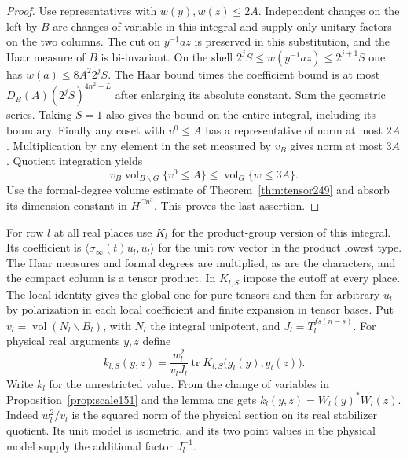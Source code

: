 \documentclass[a4paper,11pt]{article}
\theoremstyle{definition}
\theoremstyle{remark}
\numberwithin{equation}{section}
\begin{document}
\begin{proof}
Use representatives with \(w(y),w(z)\le2A\).
Independent changes on the left by \(B\) are changes of variable
in this integral and supply only unitary factors on the two
columns. The cut on \(y^{-1}az\) is preserved in this substitution,
and the Haar measure of \(B\) is bi-invariant. On the shell
\(2^j S\le w(y^{-1}az)\le2^{j+1}S\) one has
\(w(a)\le8 A^2 2^j S\). The Haar bound times the coefficient
bound is at most \(D_B(A)(2^j S)^{4n^2-L}\) after enlarging its
absolute constant. Sum the geometric series. Taking \(S=1\)
also gives the bound on the entire integral, including its
boundary. Finally any coset with \(v^0\le A\) has a representative
of norm at most \(2A\). Multiplication by any element in the
set measured by \(v_B\) gives norm at most \(3A\).
Quotient integration yields
\[
 v_B\operatorname{vol}_{B\backslash G}\{v^0\le A\}
          \le\operatorname{vol}_G\{w\le3A\}.
\]
Use the formal-degree volume estimate of
Theorem~\ref{thm:tensor249} and absorb its dimension constant
in \(H^{Cn^3}\). This proves the last assertion.
\end{proof}

For row \(l\) at all real places use \(K_l\) for the product-group
version of this integral. Its coefficient is
\(\langle\sigma_\infty(t)u_l,u_l\rangle\) for the unit row vector
in the product lowest type. The Haar measures and formal degrees
are multiplied, as are the characters, and the compact column
is a tensor product. In \(K_{l,S}\) impose the cutoff at every
place. The local identity gives the global one for pure tensors
and then for arbitrary \(u_l\) by polarization in each local
coefficient and finite expansion in tensor bases.
Put \(v_l=\operatorname{vol}(N_l\backslash B_l)\), with \(N_l\)
the integral unipotent, and
\(J_l=T_l^{fs(n-s)}\). For physical real arguments \(y,z\) define
\[
 k_{l,S}(y,z)=\frac{w_l^2}{v_l J_l}
       \operatorname{tr}K_{l,S}\bigl(g_l(y),g_l(z)\bigr).
\]
Write \(k_l\) for the unrestricted value. From the change of
variables in Proposition~\ref{prop:scale151} and the lemma one
gets \(k_l(y,z)=W_l(y)^*W_l(z)\). Indeed \(w_l^2/v_l\) is the
squared norm of the physical section on its real stabilizer
quotient. Its unit model is isometric, and its two point values
in the physical model supply the additional factor \(J_l^{-1}\).
\end{document}

